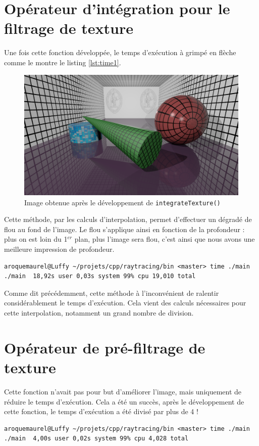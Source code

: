 \documentclass[a4paper, 11pt]{article}
\begin{document}
	\section{Opérateur d'intégration pour le filtrage de texture}
	Une fois cette fonction développée, le temps d'exécution à grimpé en flèche comme le montre le listing \ref{lst:time1}.
	\begin{figure}[H]
		\centering
		\includegraphics[width=13cm]{images/3-monimage.png}
		\caption{Image obtenue après le développement de \texttt{integrateTexture()}}
		\label{fig:fig1}
	\end{figure}
	Cette méthode, par les calculs d'interpolation, permet d'effectuer un dégradé de flou au fond de l'image. Le flou s'applique ainsi en fonction de
	la profondeur : plus on est loin du 1$^{er}$ plan, plus l'image sera flou, c'est ainsi que nous avons une meilleure impression de profondeur.

	\begin{lstlisting}[language=Sh, label=lst:time1, caption=Temps d'execution avec \texttt{interpolateTexture}]
aroquemaurel@Luffy ~/projets/cpp/raytracing/bin <master> time ./main
./main  18,92s user 0,03s system 99% cpu 19,010 total

\end{lstlisting}
Comme dit précédemment, cette méthode à l'inconvénient de ralentir considérablement le temps d'exécution. Cela vient des calculs nécessaires pour
cette interpolation, notamment un grand nombre de division.

\section{Opérateur de pré-filtrage de texture}\label{diminution}
	Cette fonction n'avait pas pour but d'améliorer l'image, mais uniquement de réduire le temps d'exécution. Cela a été un succès, après le développement de cette fonction, le temps d'exécution a été divisé par plus de 4 ! 
\begin{lstlisting}[language=Sh]
aroquemaurel@Luffy ~/projets/cpp/raytracing/bin <master> time ./main
./main  4,00s user 0,02s system 99% cpu 4,028 total
\end{lstlisting}
\end{document}
